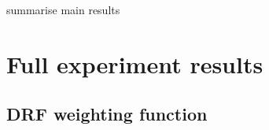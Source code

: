\documentclass[
	twoside=false, %
]{kaobook}
\begin{document}
summarise main results




\appendix %





\chapter{Full experiment results}
\label{sec:drf-full-results}

\section{DRF weighting function}
\end{document}
